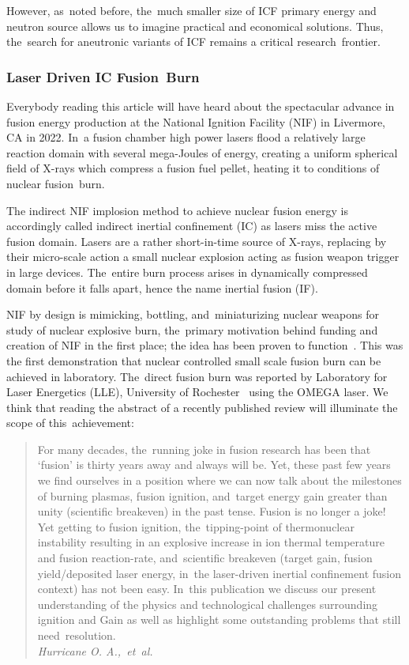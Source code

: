 \documentclass[particles,article,accept,pdftex,moreauthors]{Definitions/mdpi}
\begin{document}
However, as~noted before, the~much smaller size of ICF primary energy and neutron source allows us to imagine practical and economical solutions. Thus, the~search for aneutronic variants of ICF remains a critical research~frontier.

\subsubsection{Laser Driven IC Fusion~Burn}\label{sssec:NIF}
Everybody reading this article will have heard about the spectacular advance in fusion energy production at the National Ignition Facility (NIF) in Livermore, CA in 2022. In~a fusion chamber high power lasers flood a relatively large reaction domain with several mega-Joules of energy, creating a uniform spherical field of X-rays which compress a fusion fuel pellet, heating it to conditions of nuclear fusion~burn.

The indirect NIF implosion method to achieve nuclear fusion energy is accordingly called indirect inertial confinement (IC) as lasers miss the active fusion domain. Lasers are a rather short-in-time source of X-rays, replacing by their micro-scale action a small nuclear explosion acting as fusion weapon trigger in large devices. The~entire burn process arises in dynamically compressed domain before it falls apart, hence the name inertial fusion (IF). 

NIF by design is mimicking, bottling, and~miniaturizing nuclear weapons for study of nuclear explosive burn, the~primary motivation behind funding and creation of NIF in the first place; the idea has been proven to function~\cite{Zylstra:2022burn,Hurricane:2023Review,Hurricane:2025}. This was the first demonstration that nuclear controlled small scale fusion burn can be achieved in laboratory. The~direct fusion burn was reported by Laboratory for Laser Energetics (LLE), University of Rochester~\cite{Manion:2022Omega,Gopalaswamy:2024direct} using the OMEGA laser. We think that reading the abstract of a recently published review will illuminate the scope of this~achievement:
\begin{quote}
For many decades, the~running joke in fusion research has been that `fusion' is thirty years away and always will be. Yet, these past few years we find ourselves in a position where we can now talk about the milestones of burning plasmas, fusion ignition, and~target energy gain greater than unity (scientific breakeven) in the past tense. Fusion is no longer a joke! Yet getting to fusion ignition, the~tipping-point of thermonuclear instability resulting in an explosive increase in ion thermal temperature and fusion reaction-rate, and~scientific breakeven (target gain, fusion yield/deposited laser energy, in~the laser-driven inertial confinement fusion context) has not been easy. In~this publication we discuss our present understanding of the physics and technological challenges surrounding ignition and Gain as well as highlight some outstanding problems that still need~resolution.\\
\emph{Hurricane O. A.,~et~al.}~\cite{Hurricane:2025}
\end{quote}
 
\end{document}
